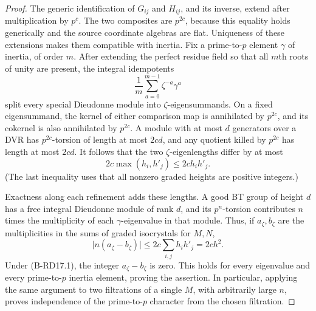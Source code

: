 \begin{proof}
The generic identification of $G_{ij}$ and $H_{ij}$, and its inverse,
extend after multiplication by $p^c$. The two composites are
$p^{2c}$, because this equality holds generically and the source
coordinate algebras are flat. Uniqueness of these extensions makes
them compatible with inertia. Fix a prime-to-$p$ element $\gamma$
of inertia, of order $m$. After extending the perfect residue field
so that all $m$th roots of unity are present, the integral
idempotents
\[
 \frac1m\sum_{a=0}^{m-1}\zeta^{-a}\gamma^a
\]
split every special Dieudonne module into $\zeta$-eigensummands.
On a fixed eigensummand, the kernel of either comparison map is
annihilated by $p^{2c}$, and its cokernel is also annihilated by
$p^{2c}$. A module with at most $d$ generators over a DVR has
$p^{2c}$-torsion of length at most $2cd$, and any quotient killed
by $p^{2c}$ has length at most $2cd$. It follows that the two
$\zeta$-eigenlengths differ by at most
\[
 2c\max(h_i,h'_j)\leq2ch_i h'_j.
                                                        \tag{B-RD17.3}
\]
(The last inequality uses that all nonzero graded heights are
positive integers.)

Exactness along each refinement adds these lengths. A good BT group
of height $d$ has a free integral Dieudonne module of rank $d$, and
its $p^n$-torsion contributes $n$ times the multiplicity of each
$\gamma$-eigenvalue in that module. Thus, if $a_\zeta,b_\zeta$ are
the multiplicities in the sums of graded isocrystals for $M,N$,
\[
 \bigl|n(a_\zeta-b_\zeta)\bigr|
 \leq 2c\sum_{i,j}h_i h'_j=2ch^2.
\]
Under (B-RD17.1), the integer $a_\zeta-b_\zeta$ is zero. This holds
for every eigenvalue and every prime-to-$p$ inertia element, proving
the assertion. In particular, applying the same argument to two
filtrations of a single $M$, with arbitrarily large $n$, proves
independence of the prime-to-$p$ character from the chosen filtration.
\end{proof}


